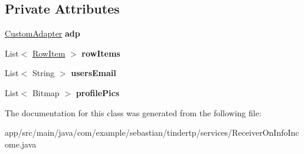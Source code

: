 \subsection*{Private Attributes}
\begin{DoxyCompactItemize}
\item 
\hyperlink{classcom_1_1example_1_1sebastian_1_1tindertp_1_1chatListTools_1_1CustomAdapter}{Custom\+Adapter} {\bfseries adp}\hypertarget{classcom_1_1example_1_1sebastian_1_1tindertp_1_1services_1_1ReceiverOnInfoIncome_a02692ef8f8e9e7a17c57637aa91ec16b}{}\label{classcom_1_1example_1_1sebastian_1_1tindertp_1_1services_1_1ReceiverOnInfoIncome_a02692ef8f8e9e7a17c57637aa91ec16b}

\item 
List$<$ \hyperlink{classcom_1_1example_1_1sebastian_1_1tindertp_1_1chatListTools_1_1RowItem}{Row\+Item} $>$ {\bfseries row\+Items}\hypertarget{classcom_1_1example_1_1sebastian_1_1tindertp_1_1services_1_1ReceiverOnInfoIncome_aa256bfa59706b1f9d11470ea3eff4c9f}{}\label{classcom_1_1example_1_1sebastian_1_1tindertp_1_1services_1_1ReceiverOnInfoIncome_aa256bfa59706b1f9d11470ea3eff4c9f}

\item 
List$<$ String $>$ {\bfseries users\+Email}\hypertarget{classcom_1_1example_1_1sebastian_1_1tindertp_1_1services_1_1ReceiverOnInfoIncome_a2aa691cdeae39137070088fe6ea3f1da}{}\label{classcom_1_1example_1_1sebastian_1_1tindertp_1_1services_1_1ReceiverOnInfoIncome_a2aa691cdeae39137070088fe6ea3f1da}

\item 
List$<$ Bitmap $>$ {\bfseries profile\+Pics}\hypertarget{classcom_1_1example_1_1sebastian_1_1tindertp_1_1services_1_1ReceiverOnInfoIncome_a130fc5678347344a6f62eda0bffa52fe}{}\label{classcom_1_1example_1_1sebastian_1_1tindertp_1_1services_1_1ReceiverOnInfoIncome_a130fc5678347344a6f62eda0bffa52fe}

\end{DoxyCompactItemize}


The documentation for this class was generated from the following file\+:\begin{DoxyCompactItemize}
\item 
app/src/main/java/com/example/sebastian/tindertp/services/Receiver\+On\+Info\+Income.\+java\end{DoxyCompactItemize}
